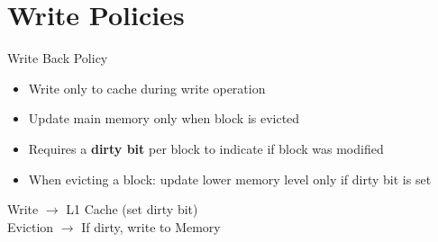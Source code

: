 \documentclass[aspectratio=169,12pt]{beamer}
\begin{document}
\section{Write Policies}
\begin{frame}{Write Back Policy}
\begin{itemize}
    \item Write only to cache during write operation
    \item Update main memory only when block is evicted
    \item Requires a \textbf{dirty bit} per block to indicate if block was modified
    \item When evicting a block: update lower memory level only if dirty bit is set
\end{itemize}

\begin{center}
\begin{tcolorbox}[colback=blue!10, width=0.7\textwidth]
Write $\rightarrow$ L1 Cache (set dirty bit)\\
Eviction $\rightarrow$ If dirty, write to Memory
\end{tcolorbox}
\end{center}
\end{frame}
\end{document}
